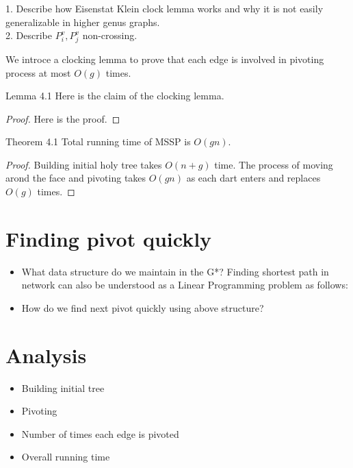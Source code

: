 \documentclass{article}
\begin{document}
\begin{center}
{\color{red}
1. Describe how Eisenstat Klein clock lemma works and why it is not easily
generalizable in higher genus graphs. 
\\
2. Describe $P_i^{v}, P_j^{v}$ non-crossing.}
\end{center}

We introce a clocking lemma to prove that each edge is involved in pivoting 
process at most $O(g)$ times.

\begin{oneshot}{Lemma 4.1}
Here is the claim of the clocking lemma.
\end{oneshot}
\begin{proof}
Here is the proof.
\end{proof}


\begin{oneshot}{Theorem 4.1}
Total running time of MSSP is $O(gn)$.
\end{oneshot}
\begin{proof}
Building initial holy tree takes $O(n + g)$ time. The process of moving arond the
face and pivoting takes $O(gn)$ as each dart enters and replaces $O(g)$ times.
\end{proof}

\section{Finding pivot quickly}
\begin{itemize}
\item What data structure do we maintain in the G*?
Finding shortest path in network can also be understood as a Linear Programming 
problem as follows:
\item How do we find next pivot quickly using above structure?
\end{itemize}

\section{Analysis}
\begin{itemize}
\item Building initial tree
\item Pivoting
\item Number of times each edge is pivoted
\item Overall running time
\end{itemize}
\end{document}
